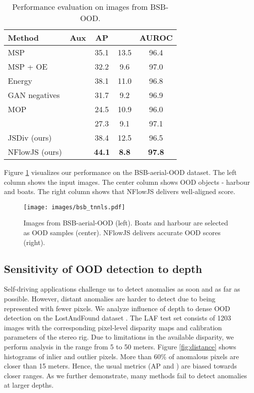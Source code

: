 \documentclass[lettersize,journal,hidelinks]{IEEEtran}
\newcommand{\cmark}{\ding{51}}
\newcommand{\xmark}{\ding{55}}
\begin{document}
\begin{table}[ht]
\centering
\caption{
Performance evaluation on  images from BSB-OOD.
}

\label{tbl:bsb_ood}
\begin{footnotesize}
\begin{tabular}{l|cccc}
\hline \hline
Method & Aux & AP  &   & AUROC    \\ \hline
MSP \cite{hendrycks17iclr} &  \xmark  &  35.1 & 13.5 &  96.4  \\
MSP + OE \cite{hendrycks19iclr} &  \cmark  & 32.2 & 9.6 & 97.0   \\
Energy \cite{liu20neurips} &  \cmark  & 38.1 & 11.0 & 96.8   \\
GAN negatives \cite{lee18iclr} &  \xmark  & 31.7 & 9.2 & 96.9   \\\hdashline
MOP \cite{dasilva20arxiv} &  \xmark  & 24.5 & 10.9 & 96.0   \\ 
 \cite{gawlikowski21igrass} &  \cmark  & 27.3 & 9.1 &  97.1  \\
\hdashline
JSDiv (ours) & \cmark   & 38.4   & 12.5  &  96.5   \\
NFlowJS (ours) & \xmark   &  \textbf{44.1} &  \textbf{8.8}  &  \textbf{97.8}  \\\hline
\end{tabular}
\end{footnotesize}
\end{table}


Figure \ref{fig:bsb_fig} visualizes our performance on the BSB-aerial-OOD dataset.
The left column shows the input images.
The center column shows OOD objects - harbour and boats. 
The right column shows that NFlowJS delivers well-aligned score.
\begin{figure}[ht]
    \centering
    \texttt{[image: images/bsb\_tnnls.pdf]}
    \caption{Images from BSB-aerial-OOD (left). Boats and harbour are selected as OOD samples (center). NFlowJS delivers accurate OOD scores (right).
}
    \label{fig:bsb_fig}
\end{figure}

\subsection{Sensitivity of OOD detection to depth}
Self-driving applications challenge us to detect anomalies as soon and as far as possible. 
However, distant anomalies are harder to detect due to being represented with fewer pixels.
We analyze influence of depth to dense OOD detection on the LostAndFound dataset \cite{pinggera16iros}.
The LAF test set consists of 1203 images with the corresponding pixel-level disparity maps and calibration parameters of the stereo rig.
Due to limitations in the available disparity, we perform analysis in the range from 5 to 50 meters.
Figure \ref{fig:distance} shows histograms of inlier and outlier pixels.
More than 60\% of anomalous pixels are closer than 15 meters.
Hence, the usual metrics (AP and ) are biased towards closer ranges.
As we further demonstrate, many methods fail to detect anomalies at larger depths.
\end{document}
